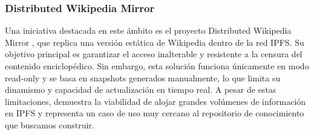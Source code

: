\subsubsection{Distributed Wikipedia Mirror}

Una iniciativa destacada en este ámbito es el proyecto Distributed Wikipedia Mirror \cite{distributed-wikipedia-mirror}, que replica una versión estática de Wikipedia dentro de la red IPFS. Su objetivo principal es garantizar el acceso inalterable y resistente a la censura del contenido enciclopédico. Sin embargo, esta solución funciona únicamente en modo read-only y se basa en snapshots generados manualmente, lo que limita su dinamismo y capacidad de actualización en tiempo real. A pesar de estas limitaciones, demuestra la viabilidad de alojar grandes volúmenes de información en IPFS y representa un caso de uso muy cercano al repositorio de conocimiento que buscamos construir.